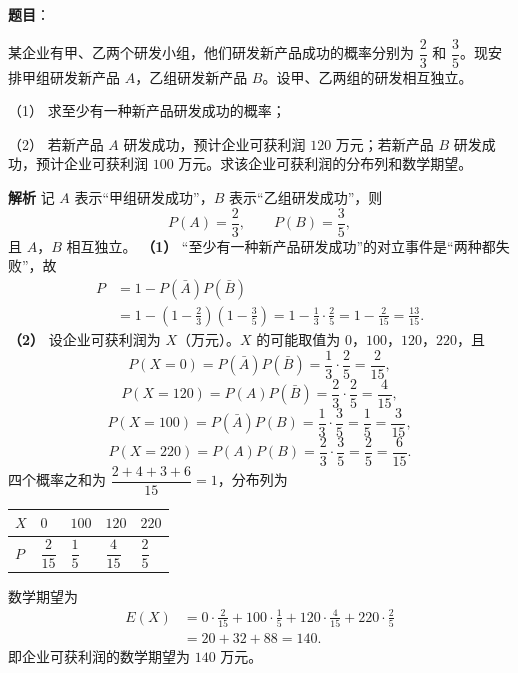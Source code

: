\begin{answer}

\textbf{题目}：

某企业有甲、乙两个研发小组，他们研发新产品成功的概率分别为 $\dfrac23$ 和 $\dfrac35$。现安排甲组研发新产品 $A$，乙组研发新产品 $B$。设甲、乙两组的研发相互独立。

（1） 求至少有一种新产品研发成功的概率；

（2） 若新产品 $A$ 研发成功，预计企业可获利润 $120$ 万元；若新产品 $B$ 研发成功，预计企业可获利润 $100$ 万元。求该企业可获利润的分布列和数学期望。

\textbf{解析}
记 $A$ 表示“甲组研发成功”，$B$ 表示“乙组研发成功”，则
\nopagebreak[4]
\[P(A)=\frac23,\qquad P(B)=\frac35,\]
且 $A$，$B$ 相互独立。
\textbf{（1）} “至少有一种新产品研发成功”的对立事件是“两种都失败”，故
\nopagebreak[4]
\[\begin{aligned}
P&=1-P(\bar A)P(\bar B)\\
&=1-\left(1-\frac23\right)\left(1-\frac35\right)
=1-\frac13\cdot\frac25
=1-\frac2{15}=\frac{13}{15}.
\end{aligned}\]
\textbf{（2）} 设企业可获利润为 $X$（万元）。$X$ 的可能取值为 $0$，$100$，$120$，$220$，且
\nopagebreak[4]
\[P(X=0)=P(\bar A)P(\bar B)=\frac13\cdot\frac25=\frac2{15},\]
\nopagebreak[4]
\[P(X=120)=P(A)P(\bar B)=\frac23\cdot\frac25=\frac4{15},\]
\nopagebreak[4]
\[P(X=100)=P(\bar A)P(B)=\frac13\cdot\frac35=\frac15=\frac3{15},\]
\nopagebreak[4]
\[P(X=220)=P(A)P(B)=\frac23\cdot\frac35=\frac25=\frac6{15}.\]
四个概率之和为 $\dfrac{2+4+3+6}{15}=1$，分布列为

\begin{center}
\begin{tabular}{lllll}
\toprule
$X$ & $0$ & $100$ & $120$ & $220$ \\
\midrule
$P$ & $\dfrac2{15}$ & $\dfrac15$ & $\dfrac4{15}$ & $\dfrac25$ \\
\bottomrule
\end{tabular}
\end{center}

数学期望为
\nopagebreak[4]
\[\begin{aligned}
E(X)&=0\cdot\frac2{15}+100\cdot\frac15+120\cdot\frac4{15}+220\cdot\frac25\\
&=20+32+88=140 .
\end{aligned}\]
即企业可获利润的数学期望为 $140$ 万元。



\end{answer}
